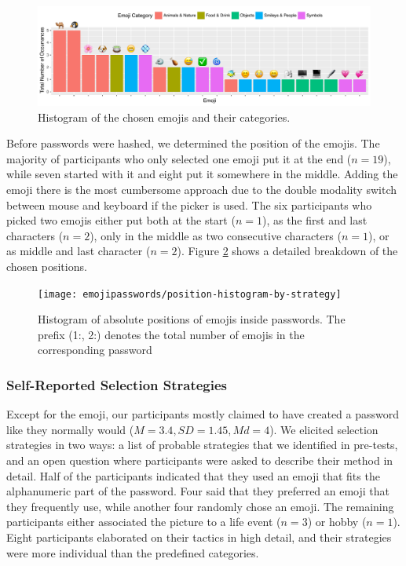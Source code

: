 \begin{figure}
	\centering
	\includegraphics[width=\linewidth]{figures/emojipasswords/emoji-distribution-histogram}
	\caption{\label{fig:emojipasswords:distribution-histogram} Histogram of the chosen emojis and their categories.}
\end{figure}


Before passwords were hashed, we determined the position of the emojis. The majority of participants who only selected one emoji put it at the end ($n=19$), while seven started with it and eight put it somewhere in the middle. Adding the emoji there is the most cumbersome approach due to the double modality switch between mouse and keyboard if the picker is used. The six participants who picked two emojis either put both at the start ($n=1$), as the first and last characters ($n=2$), only in the middle as two consecutive characters ($n=1$), or as middle and last character ($n=2$). Figure \ref{fig:emojipasswords:position-histogram-by-strategy} shows a detailed breakdown of the chosen positions.
\begin{figure}
	\centering
	\texttt{[image: emojipasswords/position-histogram-by-strategy]}
	\caption{\label{fig:emojipasswords:position-histogram-by-strategy} Histogram of absolute positions of emojis inside passwords. The prefix (1:, 2:) denotes the total number of emojis in the corresponding password}
\end{figure}


\subsubsection{Self-Reported Selection Strategies}
Except for the emoji, our participants mostly claimed to have created a password like they normally would ($M=3.4, SD=1.45, Md=4$). 
We elicited selection strategies in two ways: a list of probable strategies that we identified in pre-tests, and an open question where participants were asked to describe their method in detail. Half of the participants indicated that they used an emoji that fits the alphanumeric part of the password. Four said that they preferred an emoji that they frequently use, while another four randomly chose an emoji. The remaining participants either associated the picture to a life event ($n=3$) or hobby ($n=1$). Eight participants elaborated on their tactics in high detail, and their strategies were more individual than the predefined categories. 

